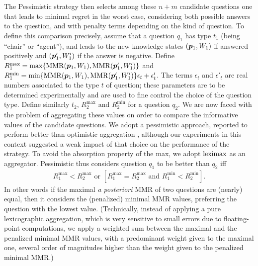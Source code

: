 \documentclass[sigconf, anonymous]{aamas}
\begin{document}
The Pessimistic strategy then selects among these $n + m$ candidate questions one that leads to minimal regret in the worst case, considering both possible answers to the question, and with penalty terms depending on the kind of question. To define this comparison precisely, assume that a question $q_1$ has type $t_1$ (being “chair” or “agent”), and leads to the new knowledge states $({\bm{p}}_1, W_1)$ if answered positively and $({\bm{p}}'_1, W'_1)$ if the answer is negative. 
Define $R^{\max}_1 = \max\{\operatorname{MMR}({\bm{p}}_1, W_1), \operatorname{MMR}({\bm{p}}'_1, W'_1)\}$
and $R^{\min}_1 = \min\{\operatorname{MMR}({\bm{p}}_1, W_1), \operatorname{MMR}({\bm{p}}'_1, W'_1)\} \epsilon_{t} + \epsilon'_{t}$.
The terms $\epsilon_t$ and $\epsilon'_{t}$ are real numbers associated to the type $t$ of question; these parameters are to be determined experimentally and are used to fine control the choice of the question type.
Define similarly $t_2$, $R^{\max}_2$ and $R^{\min}_2$ for a question $q_2$.
We are now faced with the problem of aggregating these values on order to compare the informative values of the candidate questions. We adopt a pessimistic approach, reported to perform better than optimistic aggregation \citep{Cailloux2014}, although our experiments in this context suggested a weak impact of that choice on the performance of the strategy.
To avoid the absorption property of the max, we adopt $\operatorname{leximax}$ as an aggregator.
Pessimistic thus considers question $q_1$ to be better  than $q_2$ iff
\begin{align}
	R^{\max}_1 < R^{\max}_2 \text{ or } [R^{\max}_1 = R^{\max}_2 \text{ and } R^{\min}_1 < R^{\min}_2].
\end{align}
In other words if the maximal {\em a posteriori} MMR of two questions are (nearly) equal, then it considers the (penalized) minimal MMR values, preferring the question with the lowest value.
(Technically, instead of applying a pure lexicographic aggregation, which is very sensitive to small errors due to floating-point computations, we apply a weighted sum between the maximal and the penalized minimal MMR values, with a predominant weight given to the maximal one, several order of magnitudes higher than the weight given to the penalized minimal MMR.)
\end{document}
